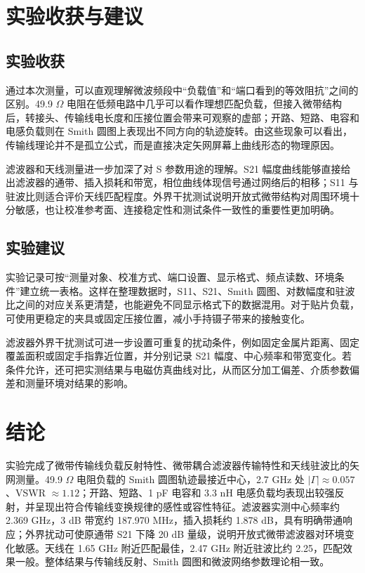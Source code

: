 \documentclass{ctexart}
\begin{document}
\section{实验收获与建议}

\subsection{实验收获}

通过本次测量，可以直观理解微波频段中“负载值”和“端口看到的等效阻抗”之间的区别。49.9 $\Omega$ 电阻在低频电路中几乎可以看作理想匹配负载，但接入微带结构后，转接头、传输线电长度和压接位置会带来可观察的虚部；开路、短路、电容和电感负载则在 Smith 圆图上表现出不同方向的轨迹旋转。由这些现象可以看出，传输线理论并不是孤立公式，而是直接决定矢网屏幕上曲线形态的物理原因。

滤波器和天线测量进一步加深了对 S 参数用途的理解。S21 幅度曲线能够直接给出滤波器的通带、插入损耗和带宽，相位曲线体现信号通过网络后的相移；S11 与驻波比则适合评价天线匹配程度。外界干扰测试说明开放式微带结构对周围环境十分敏感，也让校准参考面、连接稳定性和测试条件一致性的重要性更加明确。

\subsection{实验建议}

实验记录可按“测量对象、校准方式、端口设置、显示格式、频点读数、环境条件”建立统一表格。这样在整理数据时，S11、S21、Smith 圆图、对数幅度和驻波比之间的对应关系更清楚，也能避免不同显示格式下的数据混用。对于贴片负载，可使用更稳定的夹具或固定压接位置，减小手持镊子带来的接触变化。

滤波器外界干扰测试可进一步设置可重复的扰动条件，例如固定金属片距离、固定覆盖面积或固定手指靠近位置，并分别记录 S21 幅度、中心频率和带宽变化。若条件允许，还可把实测结果与电磁仿真曲线对比，从而区分加工偏差、介质参数偏差和测量环境对结果的影响。

\section{结论}

实验完成了微带传输线负载反射特性、微带耦合滤波器传输特性和天线驻波比的矢网测量。49.9 $\Omega$ 电阻负载的 Smith 圆图轨迹最接近中心，2.7 GHz 处 $|\Gamma|\approx0.057$、VSWR $\approx1.12$；开路、短路、1 pF 电容和 3.3 nH 电感负载均表现出较强反射，并呈现出符合传输线变换规律的感性或容性特征。滤波器实测中心频率约 2.369 GHz，3 dB 带宽约 187.970 MHz，插入损耗约 1.878 dB，具有明确带通响应；外界扰动可使原通带 S21 下降 20 dB 量级，说明开放式微带滤波器对环境变化敏感。天线在 1.65 GHz 附近匹配最佳，2.47 GHz 附近驻波比约 2.25，匹配效果一般。整体结果与传输线反射、Smith 圆图和微波网络参数理论相一致。
\end{document}
